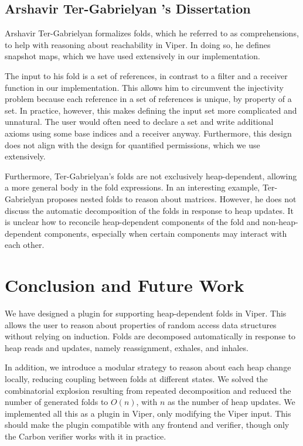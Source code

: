 \documentclass[msc,oneside]{ubcthesis}
\theoremstyle{definition}
\begin{document}
\section{Arshavir Ter-Gabrielyan 's Dissertation}
Arshavir Ter-Gabrielyan formalizes folds, which he referred to as comprehensions, to help with reasoning about reachability in Viper. In doing so, he defines snapshot maps, which we have used extensively in our implementation.

The input to his fold is a set of references, in contrast to a filter and a receiver function in our implementation. This allows him to circumvent the injectivity problem because each reference in a set of references is unique, by property of a set. In practice, however, this makes defining the input set more complicated and unnatural. The user would often need to declare a set and write additional axioms using some base indices and a receiver anyway. Furthermore, this design does not align with the design for quantified permissions, which we use extensively. 

Furthermore, Ter-Gabrielyan's folds are not exclusively heap-dependent, allowing a more general body in the fold expressions. In an interesting example, Ter-Gabrielyan proposes nested folds to reason about matrices. However, he does not discuss the automatic decomposition of the folds in response to heap updates. It is unclear how to reconcile heap-dependent components of the fold and non-heap-dependent components, especially when certain components may interact with each other. 

\chapter{Conclusion and Future Work}
We have designed a plugin for supporting heap-dependent folds in Viper. This allows the user to reason about properties of random access data structures without relying on induction. Folds are decomposed automatically in response to heap reads and updates, namely reassignment, exhales, and inhales. 

In addition, we introduce a modular strategy to reason about each heap change locally, reducing coupling between folds at different states. We solved the combinatorial explosion resulting from repeated decomposition and reduced the number of generated folds to $O(n)$, with $n$ as the number of heap updates. We implemented all this as a plugin in Viper, only modifying the Viper input. This should make the plugin compatible with any frontend and verifier, though only the Carbon verifier works with it in practice.
\end{document}
